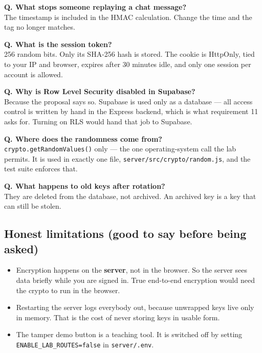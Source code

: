 \documentclass[11pt]{article}
\begin{document}
\textbf{Q. What stops someone replaying a chat message?} \\
The timestamp is included in the HMAC calculation. Change the time and the tag
no longer matches.

\textbf{Q. What is the session token?} \\
256 random bits. Only its SHA-256 hash is stored. The cookie is HttpOnly, tied
to your IP and browser, expires after 30 minutes idle, and only one session per
account is allowed.

\textbf{Q. Why is Row Level Security disabled in Supabase?} \\
Because the proposal says so. Supabase is used only as a database --- all
access control is written by hand in the Express backend, which is what
requirement 11 asks for. Turning on RLS would hand that job to Supabase.

\textbf{Q. Where does the randomness come from?} \\
\texttt{crypto.getRandomValues()} only --- the one operating-system call the
lab permits. It is used in exactly one file,
\texttt{server/src/crypto/random.js}, and the test suite enforces that.

\textbf{Q. What happens to old keys after rotation?} \\
They are deleted from the database, not archived. An archived key is a key that
can still be stolen.

\subsection*{Honest limitations (good to say before being asked)}

\begin{itemize}[leftmargin=1.4cm, itemsep=3pt]
  \item Encryption happens on the \textbf{server}, not in the browser. So the
        server sees data briefly while you are signed in. True end-to-end
        encryption would need the crypto to run in the browser.
  \item Restarting the server logs everybody out, because unwrapped keys live
        only in memory. That is the cost of never storing keys in usable form.
  \item The tamper demo button is a teaching tool. It is switched off by
        setting \texttt{ENABLE\_LAB\_ROUTES=false} in \texttt{server/.env}.
\end{itemize}

\vspace{1em}
\begin{center}
\end{center}
\end{document}
